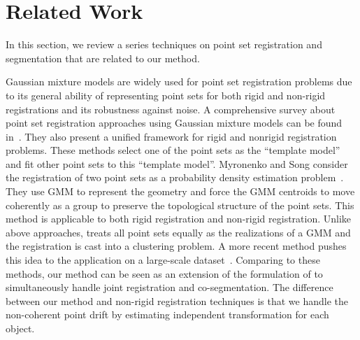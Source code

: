 \section{Related Work}
\label{sec:rw}
In this section, we review a series techniques on point set registration and segmentation that are related to our method. 

Gaussian mixture models are widely used for point set registration problems due to its general ability of representing point sets for both rigid and non-rigid registrations and its robustness against noise.
%
A comprehensive survey about point set registration approaches using Gaussian mixture models can be found in~\cite{GMM_PAMI}. 
They also present a unified framework for rigid and nonrigid registration problems. 
%
These methods select one of the point sets as the ``template model'' and fit other point sets to this ``template model''.
%
Myronenko and Song consider the registration of two point sets as a probability density estimation problem~\cite{CPD}.
They use GMM to represent the geometry and force the GMM centroids to move coherently as a group to preserve the topological structure of the point sets. 
This method is applicable to both rigid registration and non-rigid registration. 
%
%
Unlike above approaches, \cite{Evangelidis2014} treats all point sets equally as the realizations of a GMM and the registration is cast into a clustering problem. 
A more recent method pushes this idea to the application on a large-scale dataset~\cite{GOGMA}. 
Comparing to these methods, our method can be seen as an extension of the formulation of \cite{Evangelidis2014} to simultaneously handle joint registration and co-segmentation. The difference between our method and non-rigid registration techniques is that we handle the non-coherent point drift by estimating independent transformation for each object.
% 

